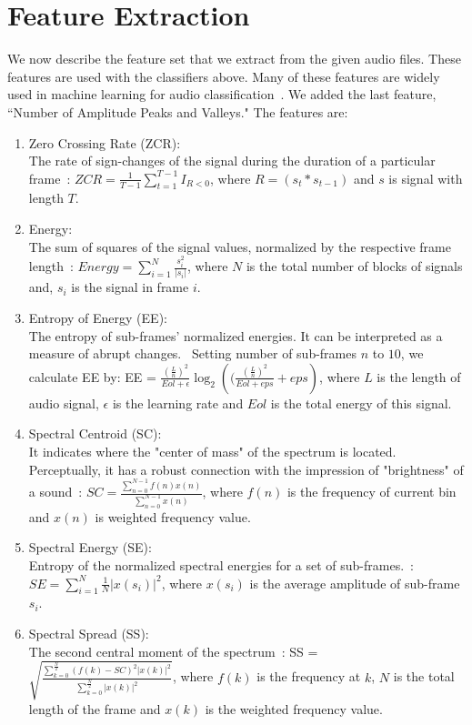 \section{Feature Extraction}
We now describe the feature set that we extract from the given audio files. These features are used with the classifiers above. Many of these features are widely used in machine learning for audio classification~\cite{b26,b27}. We added the last feature, ``Number of Amplitude Peaks and Valleys." The features are:
\begin{enumerate}
	\item Zero Crossing Rate (ZCR):\\
	The rate of sign-changes of the signal during the duration of a particular frame~\cite{b1}: $ZCR=\frac{1}{T-1}\sum_{t = 1}^{T - 1}I_{R<0}$, where $R = (s_t * s_{t-1})$ and $s$ is signal with length $T$.
	\item Energy:\\
	The sum of squares of the signal values, normalized by the respective frame length~\cite{b2}: $Energy = \sum_{i = 1}^{N} \frac{s_i^2}{|s_i|} $, where $N$ is the total number of blocks of signals and, $s_i$ is the signal in frame $i$.
	\item Entropy of Energy (EE):\\
	The entropy of sub-frames' normalized energies. It can be interpreted as a measure of abrupt changes.~\cite{b2} Setting number of sub-frames $n$ to $10$, we calculate EE by: EE = $\frac{(\frac{L}{n})^2}{Eol +\epsilon} \log_{2}({(\frac{(\frac{L}{n})^2}{Eol +eps} + eps})$, where $L$ is the length of audio signal, $\epsilon$ is the learning rate and $Eol$ is the total energy of this signal.
	\item Spectral Centroid (SC):\\
	It indicates where the "center of mass" of the spectrum is located. Perceptually, it has a robust connection with the impression of "brightness" of a sound~\cite{b3}:  $SC = \frac{\sum_{n = 0}^{N - 1} f(n)x(n)}{\sum_{n = 0}^{N - 1} x(n)}$, where $f(n)$ is the frequency of current bin and $x(n)$ is weighted frequency value.
	\item Spectral Energy (SE):\\
	Entropy of the normalized spectral energies for a set of sub-frames.~\cite{b3}: $SE = \sum_{i = 1}^{N} \frac{1}{N} |x(s_i)|^2$, where $x(s_i)$ is the average amplitude of sub-frame $s_i$.
	\item Spectral Spread (SS):\\
	The second central moment of the spectrum~\cite{b3}:  SS = $\sqrt{\frac{\sum_{k = 0}^{\frac{N}{2}} (f(k)-SC)^2 |x(k)|^2}{\sum_{k = 0}^{\frac{N}{2}} |x(k)|^2 }}$, where $f(k)$ is the frequency at $k$, $N$ is the total length of the frame and $x(k)$ is the weighted frequency value.

\end{enumerate}
